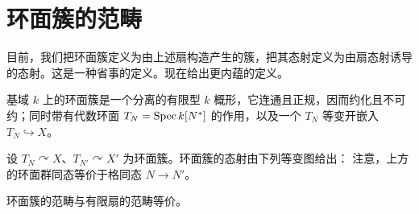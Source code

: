 \section{环面簇的范畴}
目前，我们把环面簇定义为由上述扇构造产生的簇，把其态射定义为由扇态射诱导的态射。这是一种省事的定义。现在给出更内蕴的定义。
\begin{definition}\label{def:4.11}
基域 $k$ 上的环面簇是一个分离的有限型 $k$ 概形，它连通且正规，因而约化且不可约；同时带有代数环面 $T_N=\operatorname{Spec} k[N^*]$ 的作用，以及一个 $T_N$ 等变开嵌入 $T_N\hookrightarrow X$。
\end{definition}
设 $T_N\curvearrowright X$、$T_{N'}\curvearrowright X'$ 为环面簇。环面簇的态射由下列等变图给出：
注意，上方的环面群同态等价于格同态 $N\to N'$。
\begin{theorem}\label{thm:4.10}
环面簇的范畴与有限扇的范畴等价。
\end{theorem}
